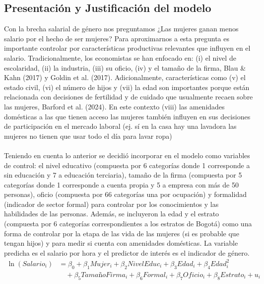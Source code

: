 \documentclass[article,11 pt]{article}
\begin{document}
\subsection{Presentación y Justificación del modelo}

Con la brecha salarial de género nos preguntamos ¿Las mujeres ganan menos salario por el hecho de ser mujeres? Para aproximarnos a esta pregunta es importante controlar por características productivas relevantes que influyen en el salario. Tradicionalmente, los economistas se han enfocado en: (i) el nivel de escolaridad, (ii) la industria, (iii) su oficio, (iv) y el tamaño de la firma, Blau & Kahn (2017) y Goldin et al. (2017). Adicionalmente, características como (v) el estado civil, (vi) el número de hijos y (vii) la edad son importantes porque están relacionada con decisiones de fertilidad y de cuidado que usualmente recaen sobre las mujeres, Barford et al. (2024). En este contexto (viii) las amenidades domésticas a las que tienen acceso las mujeres también influyen en sus decisiones de participación en el mercado laboral (ej. sí en la casa hay una lavadora las mujeres no tienen que usar todo el día para lavar ropa)
\\
\\
Teniendo en cuenta lo anterior se decidió incorporar en el modelo como variables de control: el nivel educativo (compuesta por 6 categorías donde 1 corresponde a sin educación y 7 a educación terciaria), tamaño de la firma (compuesta por 5 categorías donde 1 corresponde a cuenta propia y 5 a empresa con más de 50 personas), oficio (compuesta por 66 categorías una por ocupación) y formalidad (indicador de sector formal) para controlar por los conocimientos y las habilidades de las personas. Además, se incluyeron la edad y el estrato (compuesta por 6 categorías correspondientes a los estratos de Bogotá) como una forma de controlar por la etapa de las vida de las mujeres (si es probable que tengan hijos) y para medir si cuenta con amenidades domésticas. La variable predicha es el salario por hora y el predictor de interés es el indicador de género. 
    \begin{equation}
    \begin{split}
    \ln(Salario_i) &= \beta_0 + \beta_1 Mujer_i + \beta_2 NivelEduc_i + \beta_3 Edad_i + \beta_4 Edad^2_i  \\
    &\quad + \beta_5 TamañoFirma_i + \beta_6 Formal_i + \beta_7 Oficio_i + \beta_8 Estrato_i + u_i
    \end{split}
    \end{equation}
\end{document}
